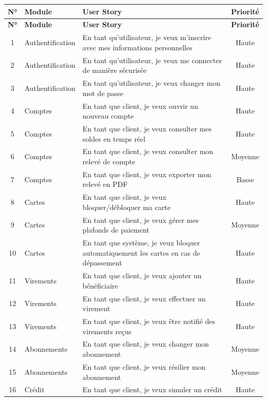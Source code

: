 \documentclass[12pt,a4paper]{report}
\begin{document}
\begin{longtable}{|c|p{2.5cm}|p{8cm}|c|}
\hline
\rowcolor{banquiseblue!30}
\textbf{N°} & \textbf{Module} & \textbf{User Story} & \textbf{Priorité} \\
\hline
\endfirsthead

\hline
\rowcolor{banquiseblue!30}
\textbf{N°} & \textbf{Module} & \textbf{User Story} & \textbf{Priorité} \\
\hline
\endhead

1 & Authentification & En tant qu'utilisateur, je veux m'inscrire avec mes informations personnelles & Haute \\
\hline
2 & Authentification & En tant qu'utilisateur, je veux me connecter de manière sécurisée & Haute \\
\hline
3 & Authentification & En tant qu'utilisateur, je veux changer mon mot de passe & Haute \\
\hline
4 & Comptes & En tant que client, je veux ouvrir un nouveau compte & Haute \\
\hline
5 & Comptes & En tant que client, je veux consulter mes soldes en temps réel & Haute \\
\hline
6 & Comptes & En tant que client, je veux consulter mon relevé de compte & Moyenne \\
\hline
7 & Comptes & En tant que client, je veux exporter mon relevé en PDF & Basse \\
\hline
8 & Cartes & En tant que client, je veux bloquer/débloquer ma carte & Haute \\
\hline
9 & Cartes & En tant que client, je veux gérer mes plafonds de paiement & Moyenne \\
\hline
10 & Cartes & En tant que système, je veux bloquer automatiquement les cartes en cas de dépassement & Haute \\
\hline
11 & Virements & En tant que client, je veux ajouter un bénéficiaire & Haute \\
\hline
12 & Virements & En tant que client, je veux effectuer un virement & Haute \\
\hline
13 & Virements & En tant que client, je veux être notifié des virements reçus & Haute \\
\hline
14 & Abonnements & En tant que client, je veux changer mon abonnement & Moyenne \\
\hline
15 & Abonnements & En tant que client, je veux résilier mon abonnement & Moyenne \\
\hline
16 & Crédit & En tant que client, je veux simuler un crédit & Haute \\

\end{longtable}
\end{document}
